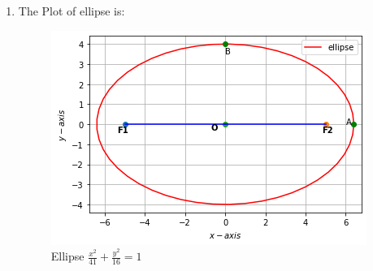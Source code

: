 \documentclass[journal,12pt,twocolumn]{IEEEtran}
\begin{document}
\begin{enumerate}
\item The Plot of ellipse is:
\begin{figure}[!ht]
    \centering
    \includegraphics[width=\columnwidth]{ellipse1.png}
    \caption{Ellipse $\frac{x^2}{41} + \frac{y^2}{16} = 1$}
    \label{fig:ellipse}
\end{figure} 
\end{enumerate}
\end{document}
